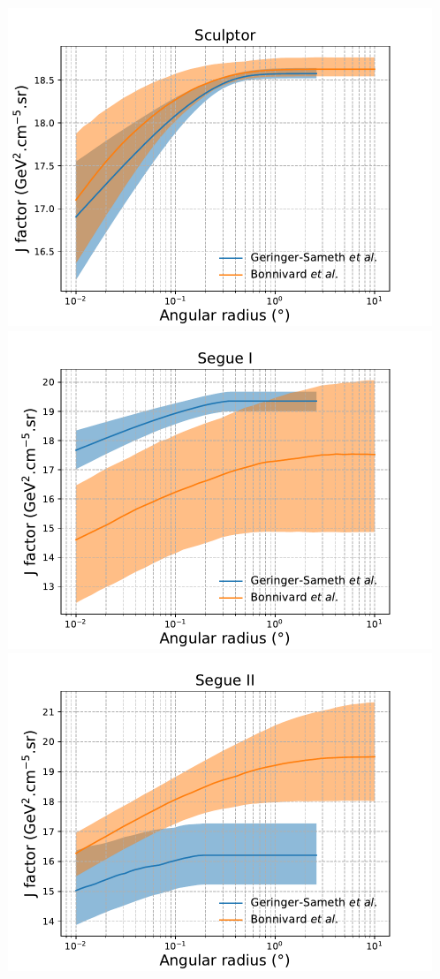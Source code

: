 \begin{figure}[ht]
{    \includegraphics[scale=0.32]{figures/glory_duck/appendix/Sculptor.pdf}
    \includegraphics[scale=0.32]{figures/glory_duck/appendix/SegueI.pdf}
    \includegraphics[scale=0.32]{figures/glory_duck/appendix/SegueII.pdf}
}
\end{figure}
